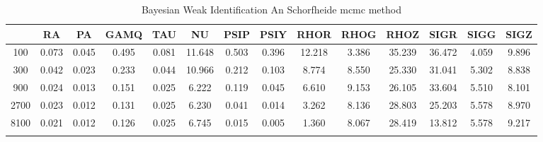 \documentclass[a4paper,10pt]{article}
\begin{document}
\centering
\begin{longtable}{cccccccccccccc}
\toprule
 & RA & PA & GAMQ & TAU & NU & PSIP & PSIY & RHOR & RHOG & RHOZ & SIGR & SIGG & SIGZ \\
\midrule
100 & 0.073 & 0.045 & 0.495 & 0.081 & 11.648 & 0.503 & 0.396 & 12.218 & 3.386 & 35.239 & 36.472 & 4.059 & 9.896 \\
300 & 0.042 & 0.023 & 0.233 & 0.044 & 10.966 & 0.212 & 0.103 & 8.774 & 8.550 & 25.330 & 31.041 & 5.302 & 8.838 \\
900 & 0.024 & 0.013 & 0.151 & 0.025 & 6.222 & 0.119 & 0.045 & 6.610 & 9.153 & 26.105 & 33.604 & 5.510 & 8.101 \\
2700 & 0.023 & 0.012 & 0.131 & 0.025 & 6.230 & 0.041 & 0.014 & 3.262 & 8.136 & 28.803 & 25.203 & 5.578 & 8.970 \\
8100 & 0.021 & 0.012 & 0.126 & 0.025 & 6.745 & 0.015 & 0.005 & 1.360 & 8.067 & 28.419 & 13.812 & 5.578 & 9.217 \\
\bottomrule
\caption{Bayesian Weak Identification An Schorfheide mcmc method}
\label{table:tbl:WeakAnScho_mcmc}
\end{longtable}
\end{document}
